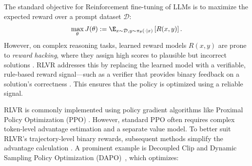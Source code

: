 The standard objective for Reinforcement fine-tuning of LLMs is to maximize the expected reward over a prompt dataset $\mathcal{D}$:
\begin{equation}
\label{eq:rl-main-objective}
    \max_\theta J(\theta) := \E_{x \sim \mathcal{D}, y \sim \pi_\theta(\cdot\mid x)}\left[ R(x, y) \right].
\end{equation}
However, on complex reasoning tasks, learned reward models $R(x,y)$ are prone to \emph{reward hacking}, where they assign high scores to plausible but incorrect solutions \citep{gao2023scaling, perez2023discovering, weng2024rewardhack, wcq2025beyond}. RLVR addresses this by replacing the learned model with a verifiable, rule-based reward signal—such as a verifier that provides binary feedback on a solution's correctness \citep{guo2025deepseek}. This ensures that the policy is optimized using a reliable signal.

RLVR is commonly implemented using policy gradient algorithms like Proximal Policy Optimization (PPO) \citep{schulman2017proximal}. However, standard PPO often requires complex token-level advantage estimation and a separate value model. To better suit RLVR's trajectory-level binary rewards, subsequent methods simplify the advantage calculation \citep{shao2024deepseekmath,yu2025dapo}. A prominent example is Decoupled Clip and Dynamic Sampling Policy Optimization (DAPO)~\citep{yu2025dapo}, which optimizes:

